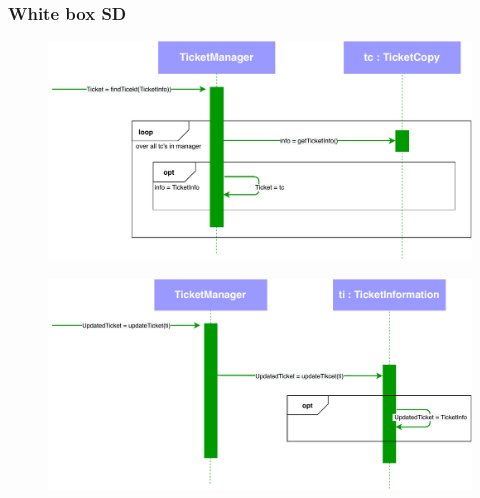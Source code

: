 \subsubsection{White box SD}
\creator{\studentA}
\updater{\studentB}
\begin{figure}[H]
    \centering
\includegraphics[scale=0.7]{Iteration_3/Files/UC2_wb1.pdf}
\end{figure}
\begin{figure}[H]
    \centering
\includegraphics[scale=0.7]{Iteration_3/Files/UC2_wb3.pdf}
\end{figure}

